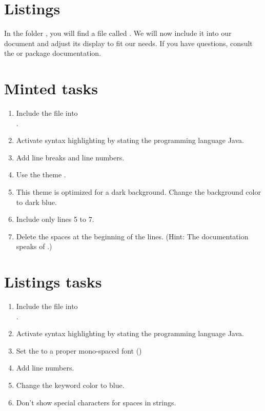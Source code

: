 \section{Listings}

In the folder , you will find a file called .
We will now include it into our document and adjust its display to fit our needs.
If you have questions, consult the  or  package documentation.

\section*{Minted tasks}

\begin{enumerate}
  \item Include the file into \\
  .
  \item Activate syntax highlighting by stating the programming language Java.
  \item Add line breaks and line numbers.
  \item Use the theme .
  \item This theme is optimized for a dark background. Change the background color to dark blue.
  \item Include only lines 5 to 7.
  \item Delete the spaces at the beginning of the lines. (Hint: The documentation speaks of .)
\end{enumerate}

\section*{Listings tasks}

\begin{enumerate}
  \item Include the file into \\
  .
  \item Activate syntax highlighting by stating the programming language Java.
  \item Set the  to a proper mono-spaced font ()
  \item Add line numbers.
  \item Change the keyword color to blue.
  \item Don't show special characters for spaces in strings.
\end{enumerate}

